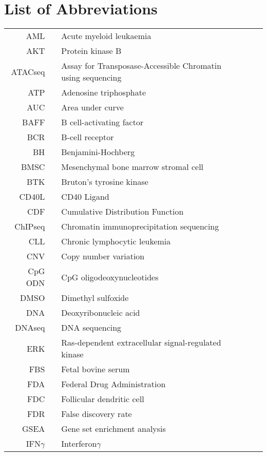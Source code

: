 \documentclass[11pt, a4paper, twosided]{book}
\begin{document}
\newpage
\tableofcontents
\clearpage

\newpage
\hypertarget{list-of-abbreviations}{%
\chapter*{List of Abbreviations}\label{list-of-abbreviations}}
\begin{tabular}{rp{0.2cm}lp{1cm}rp{0.2cm}l}
    AML & & Acute myeloid leukaemia \\
    AKT & & Protein kinase B \\
    ATACseq & & Assay for Transposase-Accessible Chromatin using sequencing \\
    ATP & & Adenosine triphosphate \\
    AUC & & Area under curve \\
    BAFF & & B cell-activating factor \\
    BCR & & B-cell receptor \\
    BH & & Benjamini-Hochberg \\
    BMSC & & Mesenchymal bone marrow stromal cell \\
    BTK & & Bruton’s tyrosine kinase \\
    CD40L & & CD40 Ligand \\
    CDF & & Cumulative Distribution Function \\
    ChIPseq & & Chromatin immunoprecipitation sequencing \\
    CLL & & Chronic lymphocytic leukemia \\
    CNV & & Copy number variation \\
    CpG ODN & & CpG oligodeoxynucleotides \\
    DMSO & & Dimethyl sulfoxide  \\
    DNA & & Deoxyribonucleic acid  \\
    DNAseq & & DNA sequencing \\
    ERK & & Ras-dependent extracellular signal-regulated kinase \\
    FBS & & Fetal bovine serum \\
    FDA & & Federal Drug Administration \\
    FDC & & Follicular dendritic cell \\
    FDR & & False discovery rate \\
    GSEA & & Gene set enrichment analysis  \\
    IFN$\gamma$ & & Interferon$\gamma$   \\ 
    
\end{tabular}
\end{document}
